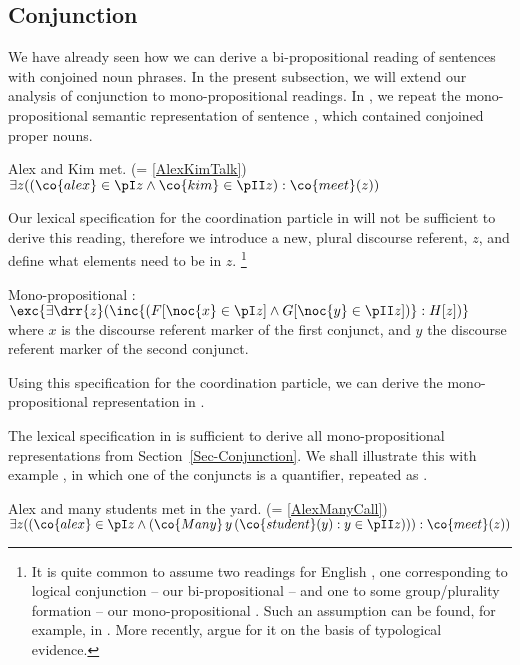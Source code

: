 \documentclass[output=paper]{langsci/langscibook}
\begin{document}
\subsection{Conjunction}\label{Sec-AnalyisConjunction}

We have already seen how we can derive a bi-propositional reading of sentences with conjoined noun phrases. In the present subsection, we will extend our analysis of conjunction to mono-propositional readings.
In , we repeat the mono-propositional semantic representation of sentence , which contained conjoined proper nouns.

\ea \label{KimAlexTalk-lf2}
Alex and Kim met. \hfill(= \ref{AlexKimTalk})
\glt $\exists z 
((\co{alex} \in \pI z
\land \co{kim} \in \pII z)
: \co{meet}(z))$
\z

Our lexical specification for the coordination particle in  will not be sufficient to derive this reading, therefore we introduce a new, plural discourse referent, $z$, and define what elements need to be in $z$.%
\footnote{It is quite common to assume two readings for English , one corresponding to logical conjunction -- our bi-propositional  -- and one to some group/plurality formation -- our mono-propositional . Such an assumption can be found, for example, in \citet{Partee:Rooth:83}. More recently, \citet{Mitrovic:Sauerland:16} argue for it on the basis of typological evidence.}

\ea \label{le-und2}
Mono-propositional :\\
$\exc{\exists \drr{z} (
\inc{(F[\noc{x}  \in \pI z]
\land 
G [\noc{y} \in \pII z]
)} : H[z]
)}$\\
where $x$ is the discourse referent marker of the first conjunct, and
$y$ the discourse referent marker of the second conjunct.
\z 

Using this specification for the coordination particle, we can derive the mono-propositional representation in .

The lexical specification in  is sufficient to derive all mono-propositional representations from Section~\ref{Sec-Conjunction}. We shall illustrate this with example , in which one of the conjuncts is a  quantifier, repeated as 
.

\ea \label{AlexManyCall-lf2}
Alex and many students met in the yard. \hfill(= \ref{AlexManyCall})\\
$
\exists z 
((\co{alex} \in \pI z 
\land 
(\co{Many}\, y\, (\co{student}(y): y \in \pII z)))
: \co{meet}(z))
$
\z 
\end{document}
